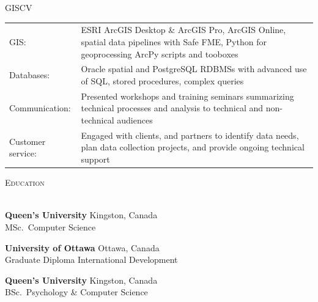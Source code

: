 \documentclass[letterpaper]{article}
\newcommand{\lineunder} {
        \vspace*{-8pt} \\
        \hspace*{-18pt} \hrulefill \\
    }
\newcommand{\header} [1] {
        {\hspace*{-18pt}\vspace*{6pt} \textsc{#1}}
        \vspace*{-6pt} \lineunder
        \vspace{1mm}
    }
\newcommand{\university}[3]{
        \textbf{#1}  %
        \hfill #2\\  %
        #3\\         %
        \vspace{2mm}
    }
\begin{document}
    \begin{taggedblock}{GISCV}
        \begin{tabular}[t]{ l L{5.17in} }
            GIS:& 
                ESRI ArcGIS Desktop \& ArcGIS Pro, ArcGIS Online, spatial data
                pipelines with Safe FME, 
                Python for geoprocessing ArcPy scripts and tooboxes
                \\
            Databases:& 
                Oracle spatial and PostgreSQL RDBMSs with advanced use of SQL,
                stored procedures, complex queries
                \\
            Communication: &
                Presented workshops and training seminars summarizing technical
                processes and analysis to technical and non-technical audiences
                \\
            Customer service: &
                Engaged with clients, and partners to identify data needs, plan data
                collection projects, and provide ongoing technical support
                \\
        \end{tabular}
    \end{taggedblock}

\vspace{6pt}



\header{Education}
    \university
        {Queen's University}
        {Kingston, Canada}
        {MSc.~Computer Science}

    \university
        {University of Ottawa}
        {Ottawa, Canada}
        {Graduate Diploma International Development}

    \university
        {Queen's University}
        {Kingston, Canada}
        {BSc.~Psychology \& Computer Science}
\end{document}
